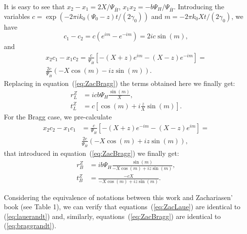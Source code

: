 \documentclass{iucr}
\begin{document}
It is easy to see that $x_2-x_1=2 X / \Psi_{\bar{H}}$, $x_1 x_2 = -b \Psi_H/\Psi_{\bar{H}}$.
Introducing the variables $c=\exp(-2\pi i  k_0 (\Psi_0-z) t / (2 \gamma_0))$ and $m=-2\pi k_0 X t / (2 \gamma_0)$, we have
\begin{equation}
    c_1-c_2=c(e^{im}-e^{-im})=2ic \sin(m),  \nonumber
\end{equation}
and
\begin{subequations}
\begin{align}
    x_2 c_1 - x_1 c_2 = \frac{c}{ \Psi_{\bar{H}}} \left[ 
 -(X+z)e^{im}-(X-z)e^{-im}\right] = \nonumber \\
 \frac{2 c}{\Psi_{\bar{H}}}(-X \cos(m) - i z \sin(m)). \nonumber
\end{align}
\end{subequations}
Replacing in equation~(\ref{eq:ZacBragg}) the terms obtained here  we finally get:
	\begin{subequations}
	\label{eq:ZacBragg2}
    \begin{align}
	r^Z_{L} &=  i c b \Psi_H \frac{\sin(m)}{X}, \nonumber \\
 	t^Z_{L} &= c [\cos(m) + i\frac{z}{X} \sin(m)].  \nonumber  
    \end{align}
    \end{subequations}
For the Bragg case, we pre-calculate
\begin{subequations}
\begin{align}
    x_2 c_2 - x_1 c_1 &=  
    \frac{c}{ \Psi_{\bar{H}}} \left[ 
 -(X+z)e^{-im}-(X-z)e^{im}\right] = \nonumber \\
 &\frac{2c}{ \Psi_{\bar{H}}}(-X \cos(m) + i z \sin(m)), \nonumber
\end{align}
\end{subequations}
that introduced in equation~(\ref{eq:ZacBragg}) we finally get:
\label{eq:ZacLaue2}
\begin{subequations}
\begin{align}
	r^Z_{B} &=  i b \Psi_H \frac{\sin(m)}{ - X \cos(m) + i z \sin(m)}, \\
 	t^Z_{B} &= \frac{ -c X}{-X \cos(m) + i z \sin(m)}. 
\end{align}
\end{subequations}

Considering the equivalence of notations between this work and Zachariasen' book (see Table 1), we can verify that equations~(\ref{eq:ZacLaue}) are identical to (\ref{eq:lauerandt}) and, similarly,  equations~(\ref{eq:ZacBragg}) are identical to (\ref{eq:braggrandt}).
\end{document}
